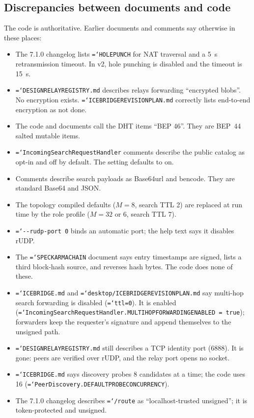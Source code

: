 \documentclass[11pt,a4paper]{article}
\newcommand{\code}[1]{\texttt{\hyphenchar\font=`\-\relax #1}}
\DeclareRobustCommand{\_}{\origunderscore\allowbreak}
\begin{document}
\subsection{Discrepancies between documents and code}
The code is authoritative. Earlier documents and comments say otherwise in these places:
\begin{itemize}
\item The 7.1.0 changelog lists \code{HOLE\_PUNCH} for NAT traversal and a 5~s retransmission
  timeout. In v2, hole punching is disabled and the timeout is 15~s.
\item \code{DESIGN\_RELAY\_REGISTRY.md} describes relays forwarding ``encrypted blobs''. No
  encryption exists. \code{ICEBRIDGE\_REVISION\_PLAN.md} correctly lists end-to-end
  encryption as not done.
\item The code and documents call the DHT items ``BEP 46''. They are BEP~44 salted mutable
  items.
\item \code{IncomingSearchRequestHandler} comments describe the public catalog as opt-in and
  off by default. The setting defaults to on.
\item Comments describe search payloads as Base64url and bencode. They are standard Base64
  and JSON.
\item The topology compiled defaults ($M = 8$, search TTL 2) are replaced at run time by the
  role profile ($M = 32$ or 6, search TTL 7).
\item \code{-{}-rudp-port 0} binds an automatic port; the help text says it disables rUDP.
\item The \code{SPEC\_KARMA\_CHAIN} document says entry timestamps are signed, lists a third
  block-hash source, and reverses hash bytes. The code does none of these.
\item \code{ICEBRIDGE.md} and \code{desktop/ICEBRIDGE\_REVISION\_PLAN.md} say multi-hop search
  forwarding is disabled (\code{ttl=0}). It is enabled
  (\code{IncomingSearchRequestHandler.MULTI\_HOP\_FORWARDING\_ENABLED = true}); forwarders keep
  the requester's signature and append themselves to the unsigned path.
\item \code{DESIGN\_RELAY\_REGISTRY.md} still describes a TCP identity port (6888). It is gone:
  peers are verified over rUDP, and the relay port opens no socket.
\item \code{ICEBRIDGE.md} says discovery probes 8 candidates at a time; the code uses 16
  (\code{PeerDiscovery.DEFAULT\_PROBE\_CONCURRENCY}).
\item The 7.1.0 changelog describes \code{/route} as ``localhost-trusted unsigned''; it is
  token-protected and unsigned.
\end{itemize}
\end{document}
